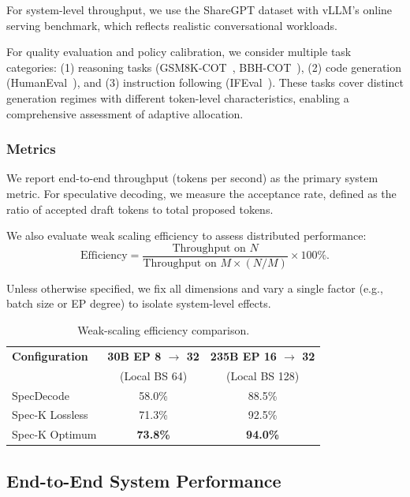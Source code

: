 \documentclass[conference]{IEEEtran}
\theoremstyle{definition} %
\begin{document}
For system-level throughput, we use the ShareGPT dataset with vLLM's online serving benchmark, which reflects realistic conversational workloads.

For quality evaluation and policy calibration, we consider multiple task categories: (1) reasoning tasks (GSM8K-COT~\cite{cobbe2021gsm8k}, BBH-COT~\cite{suzgun2023bbh}), (2) code generation (HumanEval~\cite{chen2021humaneval}), and (3) instruction following (IFEval~\cite{zhou2023ifeval}). These tasks cover distinct generation regimes with different token-level characteristics, enabling a comprehensive assessment of adaptive allocation.

\subsubsection{Metrics}

We report end-to-end throughput (tokens per second) as the primary system metric. For speculative decoding, we measure the acceptance rate, defined as the ratio of accepted draft tokens to total proposed tokens.

We also evaluate weak scaling efficiency to assess distributed performance:
\[
\text{Efficiency} = \frac{\text{Throughput on } N}{\text{Throughput on } M \times (N/M)} \times 100\%.
\]

Unless otherwise specified, we fix all dimensions and vary a single factor (e.g., batch size or EP degree) to isolate system-level effects.

\begin{table}[!t]
\renewcommand{\arraystretch}{1.2}
\caption{Weak-scaling efficiency comparison.}
\label{table:scaling_performance}
\centering
\begin{tabular}{lcc}
\toprule
\textbf{Configuration} & \textbf{30B EP 8 $\rightarrow$ 32} & \textbf{235B EP 16 $\rightarrow$ 32} \\
 & (Local BS 64) & (Local BS 128) \\
\midrule
SpecDecode & 58.0\% & 88.5\% \\
Spec-K Lossless & 71.3\% & 92.5\% \\
Spec-K Optimum  & \textbf{73.8\%} & \textbf{94.0\%} \\
\bottomrule
\end{tabular}
\end{table}


\subsection{End-to-End System Performance} \label{sec:evaluation:end2end}
\end{document}
